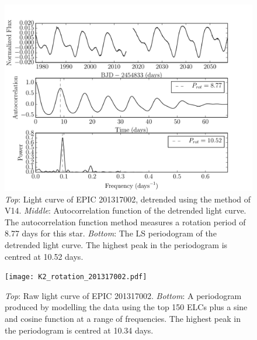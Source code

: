 \documentclass[useAMS, usenatbib, preprint, 12pt]{aastex}
\begin{document}
\begin{figure}
\begin{center}
\includegraphics[width=6in, clip=true]{rotation_poster_child.pdf}
\caption{{\it Top}: Light curve of EPIC 201317002, detrended using the method
of V14. {\it Middle}: Autocorrelation function of the
detrended light curve. The autocorrelation function method measures a rotation
period of 8.77 days for this star. {\it Bottom}: The LS periodogram
of the detrended light curve. The highest peak in the periodogram is centred at
10.52 days.}
\label{fig:rotation_poster_child}
\end{center}
\end{figure}

\begin{figure}
\begin{center}
\texttt{[image: K2\_rotation\_201317002.pdf]}
\caption{{\it Top}: Raw light curve of EPIC 201317002. {\it Bottom}: A
periodogram produced by modelling the data using the top 150 ELCs
plus a sine and cosine function at a range of frequencies. The highest peak in
the periodogram is centred at 10.34 days.}
\label{fig:K2_rotation_poster_child}
\end{center}
\end{figure}
\end{document}
